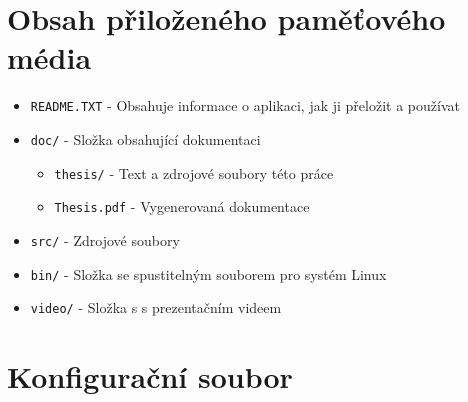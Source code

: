 
\chapter{Obsah přiloženého paměťového média}

\begin{itemize}  
\item \texttt{README.TXT} - Obsahuje informace o aplikaci, jak ji přeložit a používat
\item \texttt{doc/} - Složka obsahující dokumentaci
\begin{itemize}
\item \texttt{thesis/} - Text a zdrojové soubory této práce
\item \texttt{Thesis.pdf} - Vygenerovaná dokumentace 
\end{itemize}
\item \texttt{src/} - Zdrojové soubory
\item \texttt{bin/} - Složka se spustitelným souborem pro systém Linux
\item \texttt{video/} - Složka s s prezentačním videem
\end{itemize}


\chapter{Konfigurační soubor}
\label{appendix:configfile}

